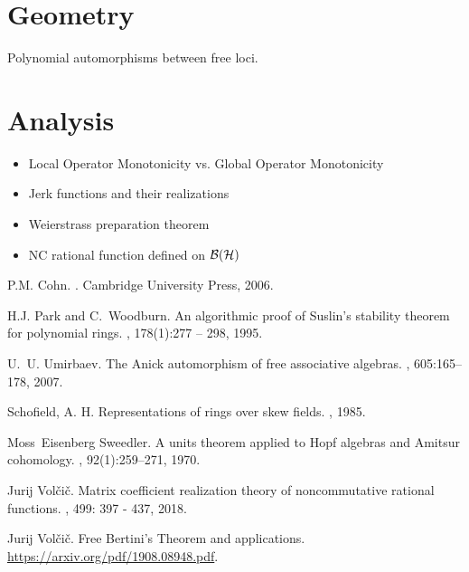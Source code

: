 \documentclass[oneside]{amsbook}
\numberwithin{equation}{section}
\begin{document}
\chapter{Geometry}

Polynomial automorphisms between free loci.


\chapter{Analysis}

\begin{itemize}
	\item Local Operator Monotonicity vs. Global Operator Monotonicity
	
	\item Jerk functions and their realizations
	
	\item Weierstrass preparation theorem
	
	\item NC rational function defined on $\mathcal{B}(\mathcal{H})$

\end{itemize}







\begin{thebibliography}{6}

P.M. Cohn.
.
\newblock Cambridge University Press, 2006.


H.J. Park and C.~Woodburn.
\newblock An algorithmic proof of {S}uslin's stability theorem for polynomial
  rings.
, 178(1):277 -- 298, 1995.

U.~U. Umirbaev.
\newblock The {A}nick automorphism of free associative algebras.
, 605:165--178, 2007.


Schofield, A. H.
\newblock Representations of rings over skew fields.
, 1985.


Moss~Eisenberg Sweedler.
\newblock A units theorem applied to {H}opf algebras and {A}mitsur cohomology.
, 92(1):259--271, 1970.



Jurij Vol{\v c}i{\v c}.
\newblock Matrix coefficient realization theory of noncommutative rational functions.
, 499: 397 - 437, 2018.

Jurij Vol{\v c}i{\v c}.
\newblock Free Bertini's Theorem and applications.
\newblock \url{https://arxiv.org/pdf/1908.08948.pdf}.


\end{thebibliography}
\end{document}
